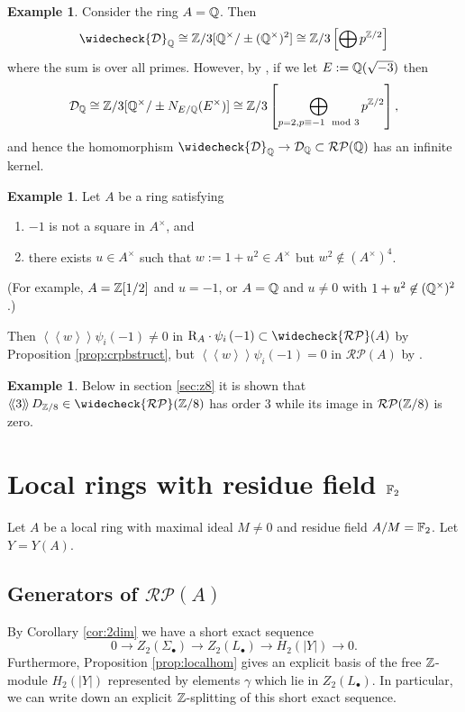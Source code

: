 \documentclass[12pt]{amsart}
\theoremstyle{definition}
\newtheorem{exa}[lem]{Example}
\newcommand{\Q}{\Bbb{Q}}
\newcommand{\F}[1]{\Bbb{F}_{#1}}
\newcommand{\Z}{\Bbb{Z}}
\newcommand{\rpb}[1]{\mathcal{RP}(#1)}%
\newcommand{\crpb}[1]{\widecheck{\mathcal{RP}}(#1)}
\newcommand{\suss}[2]{\psi_{#1}\left( #2\right)}
\newcommand{\cconst}[1]{D_{#1}}
\newcommand{\cconstmod}[1]{\mathcal{D}_{#1}}
\newcommand{\ccconstmod}[1]{\widecheck{\mathcal{D}}_{#1}}
\newcommand{\<}{\langle}
\renewcommand{\>}{\rangle}
\newcommand{\sgr}[1]{\mathrm{R}_{#1}}%
\newcommand{\pf}[1]{\left\langle\!\left\langle{#1}\right\rangle\!\right\rangle}
\begin{document}
\begin{exa} Consider the ring $A=\Q$. Then \[
\ccconstmod{\Q}\cong \Z/3[\Q^\times/\pm(\Q^\times)^2]\cong\Z/3\left[\bigoplus p^{\Z/2}\right]
\]
 where the sum is over all primes. However, by \cite[Lemma 6.5]{hut:sl2Q}, if we let $E:=\Q(\sqrt{-3})$ then
\[
\cconstmod{\Q}\cong\Z/3[\Q^\times/\pm N_{E/\Q}(E^\times)]\cong  \Z/3\left[\bigoplus_{p=2,p\equiv -1\mod 3}p^{\Z/2}\right],
\]
and hence the homomorphism $\ccconstmod{\Q}\to\cconstmod{\Q}\subset \rpb{\Q}$ has an infinite kernel.
\end{exa}
\begin{exa}  Let $A$ be a ring satisfying 
\begin{enumerate}
\item $-1$ is not a square in $A^\times$, and
\item there exists $u\in A^\times$ such that $w:=1+u^2\in A^\times$ but $w^2\not\in (A^\times)^4$.
\end{enumerate}
(For example, $A=\Z[1/2]$ and $u=-1$, or $A=\Q$ and $u\not=0$ with $1+u^2\not\in (\Q^\times)^2$.)

Then $\pf{w}\suss{i}{-1}\not=0$ in $\sgr{A}\cdot\suss{i}{-1}\subset\crpb{A}$ by Proposition \ref{prop:crpbstruct}, but $\pf{w}\suss{i}{-1}=0$ in $\rpb{A}$ by \cite[Corollary 3.22]{hut:bloch1}.
\end{exa}
\begin{exa} Below in section \ref{sec:z8} it is shown that $\pf{3}\cconst{\Z/8}\in \crpb{\Z/8}$ has order $3$ while its image in $\rpb{\Z/8}$ is zero.
\end{exa}
\section{Local rings with residue field $\F{2}$}\label{sec:f2}
Let $A$ be a local ring with maximal ideal $M\not= 0$ and residue field $A/M=\F{2}$. Let $Y=Y(A)$.





\subsection{Generators of $\rpb{A}$}
By Corollary \ref{cor:2dim} we have a short exact sequence
\[
0\to Z_2(\Sigma_\bullet)\to Z_2(L_\bullet)\to H_2(|Y|)\to 0.
\]
Furthermore, Proposition \ref{prop:localhom} gives an explicit basis of the free $\Z$-module $H_2(|Y|)$ represented by elements $\gamma$ which lie in $Z_2(L_\bullet)$. In particular, we can write down an explicit $\Z$-splitting of this short exact sequence. 
\end{document}
